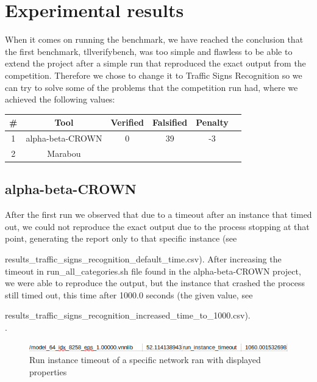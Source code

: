 \documentclass[12pt,a4paper]{report}
\newcommand\tab[1][5mm]{\hspace*{#1}}
\begin{document}
\chapter{Experimental results}
\tab When it comes on running the benchmark, we have reached the conclusion that the first benchmark, tllverifybench\cite{tll_verify_bench}, was too simple and flawless to be able to extend the project after a simple run that reproduced the exact output from the competition. Therefore we chose to change it to Traffic Signs Recognition\cite{traffic_signs_recognition} so we can try to solve some of the problems that the competition run had, where we achieved the following values:

\begin{center}
\begin{tabular}{ c c c c c c}
 \hline
 \textbf{\#} & \textbf{Tool} & \textbf{Verified} & \textbf{Falsified} & \textbf{Penalty}\\
 \hline
 1 & alpha-beta-CROWN & 0 & 39 & -3\\
 \hline
 2 & Marabou\\
 \hline
\end{tabular}
\end{center}
\vspace{10pt}

\section{alpha-beta-CROWN}
\tab After the first run we observed that due to a timeout after an instance that timed out, we could not reproduce the exact output due to the process stopping at that point, generating the report only to that specific instance (see

results\_traffic\_signs\_recognition\_default\_time.csv\cite{traffic_signs_recognition_first_solution}). After increasing the timeout in run\_all\_categories.sh file found in the alpha-beta-CROWN project, we were able to reproduce the output, but the instance that crashed the process still timed out, this time after 1000.0 seconds (the given value, see

results\_traffic\_signs\_recognition\_increased\_time\_to\_1000.csv\cite{traffic_signs_recognition_second_solution}).\\

.

\begin{figure}[h]
\centering
\includegraphics[scale=0.6]{run_instance_timeout.png}
\caption{Run instance timeout of a specific network ran with displayed properties}
\end{figure}
\end{document}
